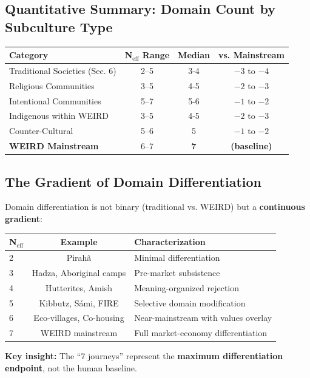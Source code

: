 \subsection{Quantitative Summary: Domain Count by Subculture Type}

\begin{center}
\begin{tabular}{@{}lccc@{}}
\toprule
\textbf{Category} & \textbf{N$_{\text{eff}}$ Range} & \textbf{Median} & \textbf{vs. Mainstream} \\
\midrule
Traditional Societies (Sec. 6) & 2--5 & 3-4 & $-3$ to $-4$ \\
\midrule
Religious Communities & 3--5 & 4-5 & $-2$ to $-3$ \\
Intentional Communities & 5--7 & 5-6 & $-1$ to $-2$ \\
Indigenous within WEIRD & 3--5 & 4-5 & $-2$ to $-3$ \\
Counter-Cultural & 5--6 & 5 & $-1$ to $-2$ \\
\midrule
\textbf{WEIRD Mainstream} & 6--7 & \textbf{7} & \textbf{(baseline)} \\
\bottomrule
\end{tabular}
\end{center}

\subsection{The Gradient of Domain Differentiation}

\begin{tcolorbox}[colback=yellow!5!white, colframe=yellow!75!black, title=Empirical Finding: Continuous Gradient from 3 to 7 Domains]

Domain differentiation is not binary (traditional vs. WEIRD) but a \textbf{continuous gradient}:

\begin{center}
\begin{tabular}{@{}lcl@{}}
\toprule
\textbf{N$_{\text{eff}}$} & \textbf{Example} & \textbf{Characterization} \\
\midrule
2 & Pirahã & Minimal differentiation \\
3 & Hadza, Aboriginal camps & Pre-market subsistence \\
4 & Hutterites, Amish & Meaning-organized rejection \\
5 & Kibbutz, Sámi, FIRE & Selective domain modification \\
6 & Eco-villages, Co-housing & Near-mainstream with values overlay \\
7 & WEIRD mainstream & Full market-economy differentiation \\
\bottomrule
\end{tabular}
\end{center}

\textbf{Key insight:} The ``7 journeys'' represent the \textbf{maximum differentiation endpoint}, not the human baseline.

\end{tcolorbox}

